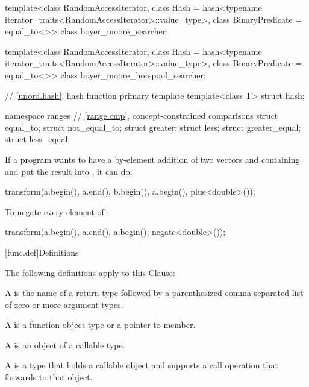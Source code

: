 \begin{codeblock}
{  template<class RandomAccessIterator,
           class Hash = hash<typename iterator_traits<RandomAccessIterator>::value_type>,
           class BinaryPredicate = equal_to<>>
    class boyer_moore_searcher;

  template<class RandomAccessIterator,
           class Hash = hash<typename iterator_traits<RandomAccessIterator>::value_type>,
           class BinaryPredicate = equal_to<>>
    class boyer_moore_horspool_searcher;

  // \ref{unord.hash}, hash function primary template
  template<class T>
    struct hash;

  namespace ranges {
    // \ref{range.cmp}, concept-constrained comparisons
    struct equal_to;
    struct not_equal_to;
    struct greater;
    struct less;
    struct greater_equal;
    struct less_equal;
  }
}
\end{codeblock}

\pnum
\begin{example}
If a \Cpp{} program wants to have a by-element addition of two vectors 
and  containing  and put the result into ,
it can do:

\begin{codeblock}
transform(a.begin(), a.end(), b.begin(), a.begin(), plus<double>());
\end{codeblock}
\end{example}

\pnum
\begin{example}
To negate every element of :

\begin{codeblock}
transform(a.begin(), a.end(), a.begin(), negate<double>());
\end{codeblock}

\end{example}

[func.def]{Definitions}

\pnum
The following definitions apply to this Clause:

\pnum
A  is the name of a return type followed by a
parenthesized comma-separated list of zero or more argument types.

\pnum
A  is a function object type or a pointer to member.

\pnum
A  is an object of a callable type.

\pnum
A  is a type that holds a callable object
and supports a call operation that forwards to that object.

